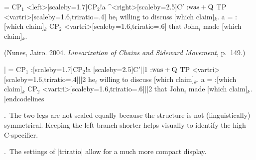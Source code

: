 
\example



\hfil
\jtree[xunit=3em,yunit=1.4em]
%
\! = {CP$_1$}
   <left>[scaleby=1.7]{CP$_2$}!a ^<right>[scaleby=2.5]{C$'$}
   :{$\rm was+Q$} {TP}
   <vartri>[scaleby=1.6,triratio=.4]
      {he$_i$ willing to discuss \what}.
\!a = :{\what} {CP$_2$}
   <vartri>[scaleby=1.6,triratio=.6]
      {that John$_i$ made \what}.
\endjtree

\bigskip
(Nunes, Jairo. 2004.  {\sl Linearization of Chains
and Sideward Movement}, p.~149.)
\medskip

\codelines
|\jtree[xunit=3em,yunit=1.4em]
\def\what{[which claim]$_k$}%
\! = {CP$_1$}
   :[scaleby=1.7]{CP$_2$}!a [scaleby=2.5]{C$'$}||1
   :{$\rm was+Q$} {TP}
   <vartri>[scaleby=1.6,triratio=.4]||2
      {he$_i$ willing to discuss \what}.
\!a = :{\what} {CP$_2$}
   <vartri>[scaleby=1.6,triratio=.6]||2
      {that John$_i$ made \what}.
\endjtree
|endcodelines

.\ The two legs are not scaled equally because the structure
is not (linguistically) symmetrical.  Keeping the left branch
shorter helps visually to identify the high C-specifier.

.\ The settings of |triratio| allow for a much more compact
display.

